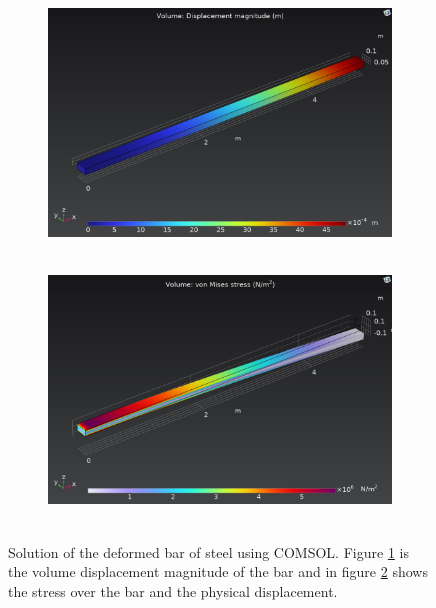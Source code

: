 \documentclass[main.tex]{subfiles}
\begin{document}
\begin{figure}[ht!]
    \centering
    \begin{subfigure}[c]{0.45\textwidth}
        \includegraphics[width=\textwidth]{imgs/hw9/volumedisplacement.png}
        \caption{~}\label{fig9:barSteela}
    \end{subfigure}
    \begin{subfigure}[c]{0.45\textwidth}
        \includegraphics[width=\textwidth]{imgs/hw9/stress.png}
        \caption{~}\label{fig9:barSteelb}
    \end{subfigure}
    \caption{
    Solution of the deformed bar of steel using COMSOL.
    Figure \ref{fig9:barSteela} is the volume displacement magnitude of the bar and in figure \ref{fig9:barSteelb} shows the stress over the bar and the physical displacement.
    }
    \label{fig9:barSteel}
\end{figure}

\end{document}
